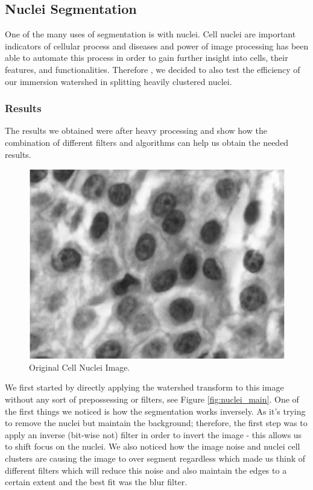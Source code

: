 \documentclass{article}
\begin{document}
\subsection{Nuclei Segmentation}
\begin{flushleft}
One of the many uses of segmentation is with nuclei. Cell nuclei are important indicators of cellular process and diseases and power of image processing has been able to automate this process in order to gain further insight into cells, their features, and functionalities. Therefore
, we decided to also test the efficiency of our immersion watershed in splitting heavily clustered nuclei.
\end{flushleft}

\subsubsection{Results}
\begin{flushleft}
The results we obtained were after heavy processing and show how the combination of different filters and algorithms can help us obtain the needed results.
\end{flushleft}
\begin{figure}[H]
    \centering
    \includegraphics[width=.6\linewidth]{experiments/nuclei/nuclei.png}
    \caption{Original Cell Nuclei Image.}
    \label{fig:cell_nuclei}
\end{figure}
\begin{flushleft}
We first started by directly applying the watershed transform to this image without any sort of prepossessing or filters, see Figure \ref{fig:nuclei_main}. One of the first things we noticed is how the segmentation works inversely. As it's trying to remove the nuclei but maintain the background; therefore, the first step was to apply an inverse (bit-wise not) filter in order to invert the image - this allows us to shift focus on the nuclei. We also noticed how the image noise and nuclei cell clusters are causing the image to over segment regardless which made us think of different filters which will reduce this noise and also maintain the edges to a certain extent and the best fit was the blur filter.
\end{flushleft}
\end{document}
